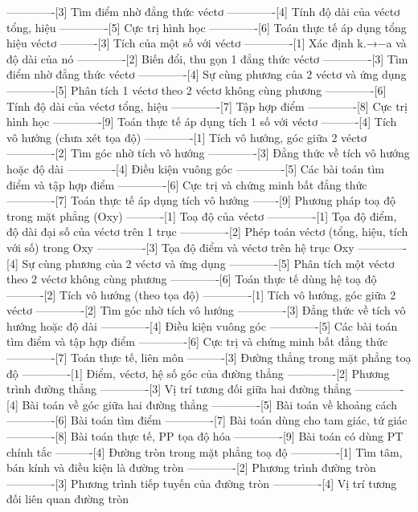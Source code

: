 -------------[3] Tìm điểm nhờ đẳng thức véctơ
-------------[4] Tính độ dài của véctơ tổng, hiệu
-------------[5] Cực trị hình học
-------------[6] Toán thực tế áp dụng tổng hiệu véctơ
----------[3] Tích của một số với véctơ
-------------[1] Xác định k.→−a và độ dài của nó
-------------[2] Biến đổi, thu gọn 1 đẳng thức véctơ
-------------[3] Tìm điểm nhờ đẳng thức véctơ
-------------[4] Sự cùng phương của 2 véctơ và ứng dụng
-------------[5] Phân tích 1 véctơ theo 2 véctơ không cùng phương
-------------[6] Tính độ dài của véctơ tổng, hiệu
-------------[7] Tập hợp điểm
-------------[8] Cực trị hình học
-------------[9] Toán thực tế áp dụng tích 1 số với véctơ
----------[4] Tích vô hướng (chưa xét tọa độ)
-------------[1] Tích vô hướng, góc giữa 2 véctơ
-------------[2] Tìm góc nhờ tích vô hướng
-------------[3] Đẳng thức về tích vô hướng hoặc độ dài
-------------[4] Điều kiện vuông góc
-------------[5] Các bài toán tìm điểm và tập hợp điểm
-------------[6] Cực trị và chứng minh bất đẳng thức
-------------[7] Toán thực tế áp dụng tích vô hướng
-------[9] Phương pháp toạ độ trong mặt phẳng (Oxy)
----------[1] Toạ độ của véctơ
-------------[1] Tọa độ điểm, độ dài đại số của véctơ trên 1 trục
-------------[2] Phép toán véctơ (tổng, hiệu, tích với số) trong Oxy
-------------[3] Tọa độ điểm và véctơ trên hệ trục Oxy
-------------[4] Sự cùng phương của 2 véctơ và ứng dụng
-------------[5] Phân tích một véctơ theo 2 véctơ không cùng phương
-------------[6] Toán thực tế dùng hệ toạ độ
----------[2] Tích vô hướng (theo tọa độ)
-------------[1] Tích vô hướng, góc giữa 2 véctơ
-------------[2] Tìm góc nhờ tích vô hướng
-------------[3] Đẳng thức về tích vô hướng hoặc độ dài
-------------[4] Điều kiện vuông góc
-------------[5] Các bài toán tìm điểm và tập hợp điểm
-------------[6] Cực trị và chứng minh bất đẳng thức
-------------[7] Toán thực tế, liên môn
----------[3] Đường thẳng trong mặt phẳng toạ độ
-------------[1] Điểm, véctơ, hệ số góc của đường thẳng
-------------[2] Phương trình đường thẳng
-------------[3] Vị trí tương đối giữa hai đường thẳng
-------------[4] Bài toán về góc giữa hai đường thẳng
-------------[5] Bài toán về khoảng cách
-------------[6] Bài toán tìm điểm
-------------[7] Bài toán dùng cho tam giác, tứ giác
-------------[8] Bài toán thực tế, PP tọa độ hóa
-------------[9] Bài toán có dùng PT chính tắc
----------[4] Đường tròn trong mặt phẳng toạ độ
-------------[1] Tìm tâm, bán kính và điều kiện là đường tròn
-------------[2] Phương trình đường tròn
-------------[3] Phương trình tiếp tuyến của đường tròn
-------------[4] Vị trí tương đối liên quan đường tròn
